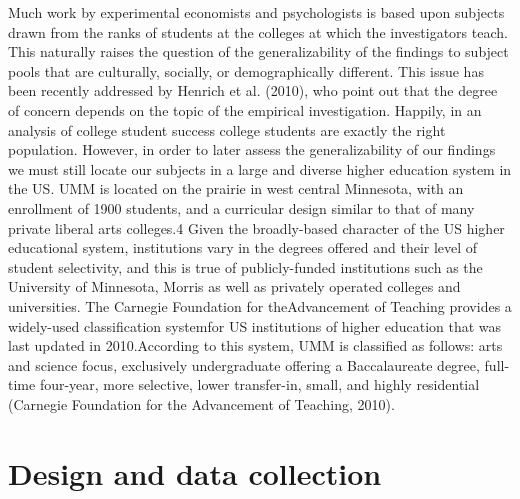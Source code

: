 \documentclass[12pt,a4paper]{article}
\begin{document}
Much work by experimental economists and psychologists is based upon subjects drawn from the ranks of students at the colleges at which the investigators teach. This naturally raises the question of the generalizability of the findings to subject pools that are culturally, socially, or demographically different. This issue has been recently addressed by Henrich et al. (2010), who point out that the degree of concern depends on the topic of the empirical investigation. Happily, in an
analysis of college student success college students are exactly the right population. However, in order to later assess the generalizability of our findings we must still locate our subjects in a large and diverse higher education system in the US.
UMM is located on the prairie in west central Minnesota, with an enrollment of 1900 students, and a curricular design
similar to that of many private liberal arts colleges.4 Given the broadly-based character of the US higher educational system,
institutions vary in the degrees offered and their level of student selectivity, and this is true of publicly-funded institutions
such as the University of Minnesota, Morris as well as privately operated colleges and universities. The Carnegie Foundation
for theAdvancement of Teaching provides a widely-used classification systemfor US institutions of higher education that was
last updated in 2010.According to this system, UMM is classified as follows: arts and science focus, exclusively undergraduate
offering a Baccalaureate degree, full-time four-year, more selective, lower transfer-in, small, and highly residential (Carnegie
Foundation for the Advancement of Teaching, 2010). 

\section{Design and data collection}
\end{document}
